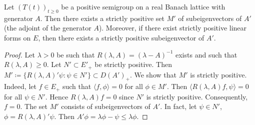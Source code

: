 \begin{proposition}\label{prop:c2-3.5}
%
Let $(T(t))_{t \geq 0}$ be a positive semigroup on a real Banach lattice with generator $A$.
Then there exists a strictly positive set $M'$ of subeigenvectors of\/ $A'$ (the adjoint of the generator $A$).
Moreover, if there exist strictly positive linear forms on $E$, then there exists a strictly positive subeigenvector of\/ $A'$.
\end{proposition}
\begin{proof}
Let $\lambda > 0$ be such that $R(\lambda,A) = (\lambda - A)^{-1}$ exists and such that $R(\lambda,A) \geq 0$.
Let $N' \subset E'_{+}$ be strictly positive.
Then $M' \coloneq \{R(\lambda,A)'\psi \colon \psi \in N'\} \subset D(A')_{+}$.
We show that $M'$ is strictly positive.
Indeed, let $f \in E_{+}$ such that $\langle f,\phi \rangle = 0$ for all $\phi \in M'$.
Then $\langle R(\lambda,A)f,\psi \rangle = 0$ for all $\psi \in N'$.
Hence $R(\lambda,A)f = 0$ since $N'$ is strictly positive.
Consequently, $f = 0$.
The set $M'$ consists of
subeigenvectors of\/ $A'$. In fact, let $\psi \in N'$, $\phi = R(\lambda,A)'\psi$. Then
$A'\phi = \lambda\phi - \psi \leq \lambda\phi$.
\end{proof}

